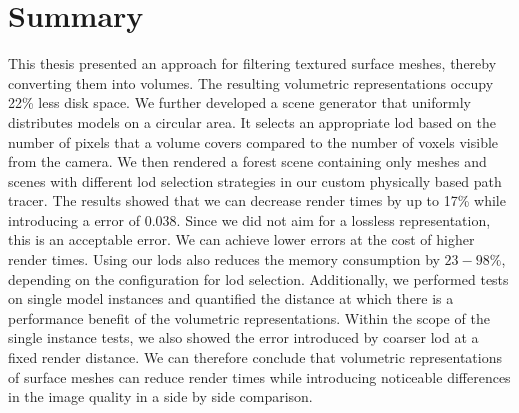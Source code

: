 \chapter{Summary}
\label{chap:summary}
This thesis presented an approach for filtering textured surface meshes, thereby converting them into volumes.
The resulting volumetric representations occupy 22\% less disk space.
We further developed a scene generator that uniformly distributes models on a circular area.
It selects an appropriate \ac{lod} based on the number of pixels that a volume covers compared to the number of voxels visible from the camera.
We then rendered a forest scene containing only meshes and scenes with different \ac{lod} selection strategies in our custom physically based path tracer.
The results showed that we can decrease render times by up to 17\% while introducing a \FLIP error of 0.038.
Since we did not aim for a lossless representation, this is an acceptable error.
We can achieve lower \FLIP errors at the cost of higher render times.
Using our \acsp{lod} also reduces the memory consumption by $23-98\%$, depending on the configuration for \ac{lod} selection.
Additionally, we performed tests on single model instances and quantified the distance at which there is a performance benefit of the volumetric representations.
Within the scope of the single instance tests, we also showed the error introduced by coarser \ac{lod} at a fixed render distance.
We can therefore conclude that volumetric representations of surface meshes can reduce render times while introducing noticeable differences in the image quality in a side by side comparison.